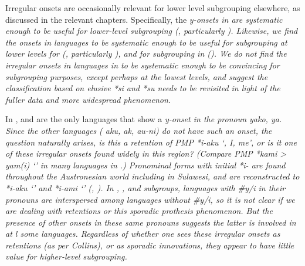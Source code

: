 Irregular onsets are occasionally relevant for lower level subgrouping
elsewhere, as discussed in the relevant chapters.
Specifically, the \it{y}-onsets in 
are systematic enough to be useful for lower-level subgrouping (, particularly ).
Likewise, we find the onsets in  languages to be systematic
enough to be useful for subgrouping at lower levels for 
(, particularly ), and for subgrouping in  ().
We do not find the irregular onsets in  languages
in  to be systematic enough to be convincing
for subgrouping purposes, except perhaps at the lowest levels,
and suggest the classification based on elusive *si
and *su \citep[128]{Collins1983} needs to be revisited in light
of the fuller data
and more widespread phenomenon.

In ,  and  are the only languages that
show a \it{y}-onset in the  pronoun \it{yako, ya}.
Since the other  languages ( \it{aku},
 \it{ak},  \it{au-ni}) do not have such an onset,
the question naturally arises,
is this a retention of PMP *i-aku ‘,
I, me’, or is it one of these irregular onsets found widely in
this region? (Compare PMP *kami > \it{yam(i)} ‘’
in many languages in .) Pronominal forms with initial
*i- are found throughout the Austronesian world including in
Sulawesi, and are reconstructed to  *i-aku ‘’
and *i-ami ‘’ (\citealp{BlustTrussel2020}, \citealp[908]{AdelaarHajek2024}).
In , , and 
subgroups, languages with \it{{\#}y/i} in their pronouns are
interspersed among languages without \it{{\#}y/i},
so it is not clear if we are dealing with retentions or this sporadic prothesis phenomenon.
But the presence of other onsets in these same pronouns suggests
the latter is involved in at l some languages.
Regardless of whether one sees these irregular onsets as retentions
(as per Collins), or as sporadic innovations,
they appear to have little value for higher-level subgrouping.
